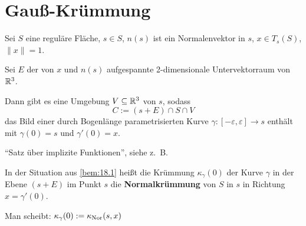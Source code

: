 \section{Gauß-Krümmung}
\begin{bemerkung}\label{bem:18.1}%
    Sei $S$ eine reguläre Fläche, $s \in S$, $n(s)$ ist ein Normalenvektor
    in $s$, $x \in T_s (S)$, $\|x\| = 1$.

    Sei $E$ der von $x$ und $n(s)$ aufgespannte 2-dimensionale 
    Untervektorraum von $\mathbb{R}^3$.

    Dann gibt es eine Umgebung $V \subseteq \mathbb{R}^3$ von $s$, sodass
    \[C := (s + E) \cap S \cap V\]
    das Bild einer durch Bogenlänge parametrisierten Kurve
    $\gamma:[-\varepsilon, \varepsilon] \rightarrow s$ enthält mit
    $\gamma(0) = s$ und $\gamma'(0) = x$.
\end{bemerkung}

\begin{beweis}
    \enquote{Satz über implizite Funktionen}, siehe z.~B. 
    \href{https://github.com/MartinThoma/LaTeX-examples/tree/master/documents/Analysis\%20II}{}
\end{beweis}

\begin{definition}%
    In der Situation aus \cref{bem:18.1} heißt die Krümmung $\kappa_\gamma(0)$
    der Kurve $\gamma$ in der Ebene $(s+ E)$ im Punkt $s$ die
    \textbf{Normalkrümmung}\footnotemark{} von $S$ in $s$ in Richtung
    $x = \gamma'(0)$.

    Man scheibt: $\kappa_\gamma(0) := \kappa_{\textnormal{Nor}}(s, x)$
\end{definition}

